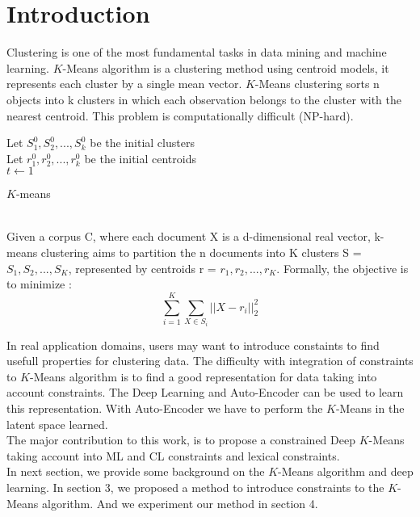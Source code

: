 \section{Introduction}\label{sec:intro}

Clustering is one of the most fundamental tasks in data mining and machine
learning. $K$-Means algorithm is a clustering method using centroid models,
it represents each cluster by a single mean vector. $K$-Means clustering sorts
n objects into k clusters in which each observation belongs to
the cluster with the nearest centroid. This problem is computationally
difficult (NP-hard).
\begin{algorithm}
  Let $S_1^{0}, S_2^{0} , ..., S_k^{0}$ be the initial clusters\\
  Let $r_1^{0}, r_2^{0} , ..., r_k^{0}$ be the initial centroids\\
  $t \gets 1$\\
  \caption{$K$-means}
\end{algorithm}
\\Given a corpus C, where each document X is a 
d-dimensional real vector, k-means clustering aims to partition the n 
documents into K clusters S = {$S_1, S_2, ..., S_K$}, represented by centroids 
r = {$r_1, r_2, ..., r_K$}. Formally, the objective is to minimize :
$$
\sum_{i=1}^K \sum_{X \in S_i} ||X - r_i ||_2^2
$$

In real application domains, users may want to introduce constaints to find
usefull properties for clustering data. The difficulty with integration of
constraints to $K$-Means algorithm  is to find a good representation for data
taking into account constraints. The Deep Learning and Auto-Encoder can be used to
learn this representation. With Auto-Encoder we have to perform the $K$-Means in
the latent space learned.
\\The major contribution to this work, is to propose a constrained Deep $K$-Means
taking account into ML and CL constraints and lexical constraints.
\\In next section, we provide some background on the $K$-Means algorithm and deep
learning. In section 3, we proposed a method to introduce constraints to the
$K$-Means algorithm. And we experiment our method in section 4.  
